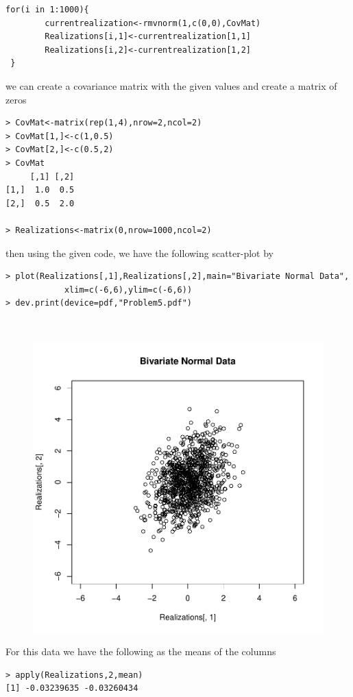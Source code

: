 \documentclass[10pt]{article}
\begin{document}
\begin{description}
\begin{lstlisting}[frame=trBL]
 for(i in 1:1000){
		currentrealization<-rmvnorm(1,c(0,0),CovMat)
		Realizations[i,1]<-currentrealization[1,1]
		Realizations[i,2]<-currentrealization[1,2]
 }
\end{lstlisting}
we can create a covariance matrix with the given values and create a matrix of zeros 
\begin{lstlisting}[frame=trBL]
> CovMat<-matrix(rep(1,4),nrow=2,ncol=2)
> CovMat[1,]<-c(1,0.5)
> CovMat[2,]<-c(0.5,2)
> CovMat
     [,1] [,2]
[1,]  1.0  0.5
[2,]  0.5  2.0

> Realizations<-matrix(0,nrow=1000,ncol=2)
\end{lstlisting}
then using the given code, we have the following scatter-plot by
\begin{lstlisting}[frame=trBL]
> plot(Realizations[,1],Realizations[,2],main="Bivariate Normal Data",
			xlim=c(-6,6),ylim=c(-6,6))
> dev.print(device=pdf,"Problem5.pdf")
\end{lstlisting}\hfill\\
\begin{figure}[ht!]
\centering
\includegraphics[width=15cm]{../Problem5.pdf}
\end{figure}
For this data we have the following as the means of the columns
\begin{lstlisting}[frame=trBL]
> apply(Realizations,2,mean)
[1] -0.03239635 -0.03260434

\end{lstlisting}
\end{description}
\end{document}
